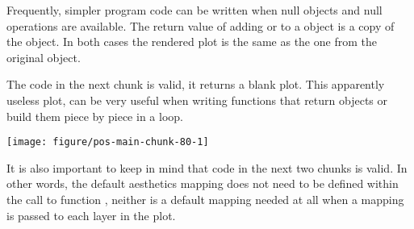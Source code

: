 \documentclass[krantz2]{krantz}\usepackage{knitr}%
\begin{document}
\begin{explainbox}
Frequently, simpler program code can be written when null objects and null operations are available. The return value of adding  or  to a  object is a copy of the object. In both cases the rendered plot is the same as the one from the original object.

\begin{knitrout}\footnotesize
{}\color{fgcolor}\begin{kframe}
\begin{alltt}
 \hlopt{+} 
 \hlopt{+} \hlstd{()}
\end{alltt}
\end{kframe}
\end{knitrout}

The code in the next chunk is valid, it returns a blank plot. This apparently useless plot, can be very useful when writing functions that return  objects or build them piece by piece in a loop.

\begin{knitrout}\footnotesize
{}\color{fgcolor}\begin{kframe}
\begin{alltt}
\hlstd{()}
\end{alltt}
\end{kframe}

{\centering \texttt{[image: figure/pos-main-chunk-80-1]} 

}



\end{knitrout}

It is also important to keep in mind that code in the next two chunks is valid. In other words, the default aesthetics mapping does not need to be defined within the call to function , neither is a default mapping needed at all when a mapping is passed to each layer in the plot.

\begin{knitrout}\footnotesize
{}\color{fgcolor}\begin{kframe}
\begin{alltt}
 \hlopt{+}
  \hlstd{(}     \hlstd{=}  \hlopt{+}
  \hlstd{()}
\end{alltt}
\end{kframe}


\end{knitrout}
\end{explainbox}
\end{document}
